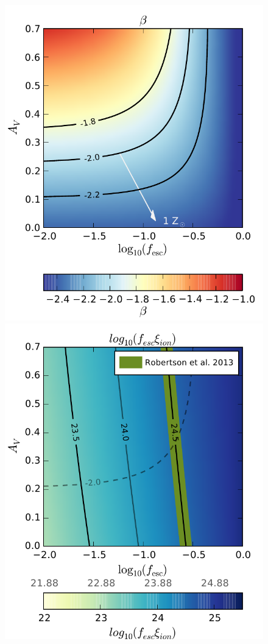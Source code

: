 \begin{landscape}
\begin{figure}
\centering
  \includegraphics[width=0.25\paperheight]{plots/Fig5a.pdf}
  \includegraphics[width=0.25\paperheight]{plots/Fig5b.pdf}

\end{figure}
\end{landscape}
